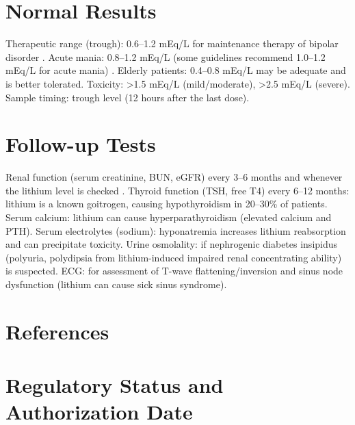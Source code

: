 \section*{Normal Results}
Therapeutic range (trough): 0.6--1.2 mEq/L for maintenance therapy of bipolar disorder \cite{malhi2020ranzcp}. Acute mania: 0.8--1.2 mEq/L (some guidelines recommend 1.0--1.2 mEq/L for acute mania) \cite{goodwin2007manic}. Elderly patients: 0.4--0.8 mEq/L may be adequate and is better tolerated. Toxicity: >1.5 mEq/L (mild/moderate), >2.5 mEq/L (severe). Sample timing: trough level (12 hours after the last dose).

\section*{Follow-up Tests}
Renal function (serum creatinine, BUN, eGFR) every 3--6 months and whenever the lithium level is checked \cite{grunfeld2009lithium}. Thyroid function (TSH, free T4) every 6--12 months: lithium is a known goitrogen, causing hypothyroidism in 20--30\% of patients. Serum calcium: lithium can cause hyperparathyroidism (elevated calcium and PTH). Serum electrolytes (sodium): hyponatremia increases lithium reabsorption and can precipitate toxicity. Urine osmolality: if nephrogenic diabetes insipidus (polyuria, polydipsia from lithium-induced impaired renal concentrating ability) is suspected. ECG: for assessment of T-wave flattening/inversion and sinus node dysfunction (lithium can cause sick sinus syndrome).

\section*{References}



\clearpage
\section*{Regulatory Status and Authorization Date}

\clearpage
